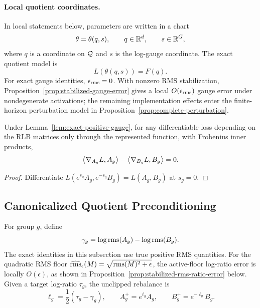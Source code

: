 \paragraph{Local quotient coordinates.}
In local statements below, parameters are written in a chart
\begin{equation}
    \theta=\theta(q,s),
    \qquad q\in\mathbb{R}^d,
    \qquad s\in\mathbb{R}^G,
\end{equation}
where $q$ is a coordinate on $\mathcal{Q}$ and $s$ is the log-gauge coordinate.  The exact quotient
model is
\begin{equation}
    L(\theta(q,s))=F(q).
    \label{eq:loss-quotient}
\end{equation}
For exact gauge identities, $\epsilon_{\rm rms}=0$.  With nonzero RMS stabilization,
Proposition~\ref{prop:stabilized-gauge-error} gives a local $O(\epsilon_{\rm rms})$
gauge error under nondegenerate activations; the remaining implementation effects enter
the finite-horizon perturbation model in Proposition~\ref{prop:complete-perturbation}.

\begin{lemma}
\label{lem:gauge-null-direction}
Under Lemma~\ref{lem:exact-positive-gauge}, for any differentiable loss depending on the
RLB matrices only through the represented function, with Frobenius inner products,
\begin{equation}
    \left\langle \nabla_{A_g}L,A_g \right\rangle-\left\langle \nabla_{B_g}L,B_g \right\rangle=0 .
    \label{eq:gauge-null-gradient}
\end{equation}
\end{lemma}

\begin{proof}
Differentiate $L(e^{s_g}A_g,e^{-s_g}B_g)=L(A_g,B_g)$ at $s_g=0$.
\end{proof}

\subsection{Canonicalized Quotient Preconditioning}
\label{app:complete-opt-proof:preconditioning}

For group $g$, define
\begin{equation}
    \gamma_g=\log \operatorname{rms}(A_g)-\log \operatorname{rms}(B_g).
    \label{eq:complete-gamma}
\end{equation}
The exact identities in this subsection use true positive RMS quantities.  For the
quadratic RMS floor $\widehat{\operatorname{rms}}_\epsilon(M)=\sqrt{\operatorname{rms}(M)^2+\epsilon}$, the active-floor
log-ratio error is locally $O(\epsilon)$, as shown in
Proposition~\ref{prop:stabilized-rms-ratio-error} below.  Given a target log-ratio
$\tau_g$, the unclipped rebalance is
\begin{equation}
    \ell_g=\frac{1}{2}(\tau_g-\gamma_g),
    \qquad
    A_g^+=e^{\ell_g}A_g,
    \qquad
    B_g^+=e^{-\ell_g}B_g.
    \label{eq:complete-rebalance}
\end{equation}

